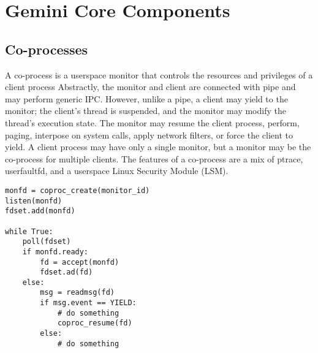 \section{Gemini Core Components}
\label{sec:gemini-abstractions}


\subsection{Co-processes}

A co-process is a userspace monitor that controls the resources and
privileges of a client process
%
Abstractly, the monitor and client are connected with pipe and may perform
generic IPC\@.
%
However, unlike a pipe, a client may yield to the monitor; the client's thread
is suspended, and the monitor may modify the thread's execution state.
%
The monitor may resume the client process, perform, paging,
interpose on system calls, apply network filters, or force the client to yield.
%
A client process may have only a single monitor, but a monitor may be the
co-process for multiple clients.
%
The features of a co-process are a mix of ptrace, userfaultfd, and a userspace
Linux Security Module (LSM).  


%
%


\begin{lstlisting}[frame=single,caption={Monitor runloop},captionpos=b]
monfd = coproc_create(monitor_id)
listen(monfd)
fdset.add(monfd)

while True:
    poll(fdset)
    if monfd.ready:
        fd = accept(monfd)
        fdset.ad(fd)
    else:
        msg = readmsg(fd)
        if msg.event == YIELD:
            # do something
            coproc_resume(fd)
        else:
            # do something
\end{lstlisting}


